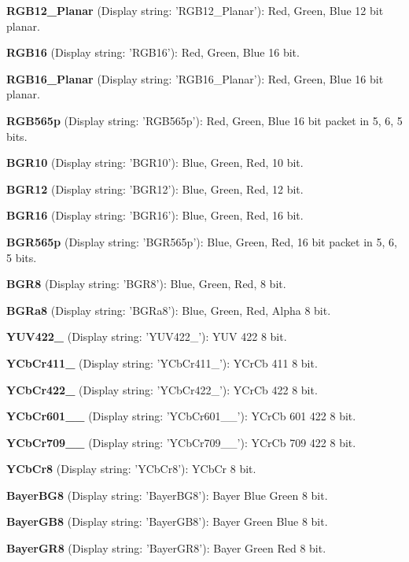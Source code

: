 \begin{DoxyItemize}
\item {\bfseries R\+G\+B12\+\_\+\+Planar} (Display string\+: 'R\+G\+B12\+\_\+\+Planar')\+: Red, Green, Blue 12 bit planar.
\item {\bfseries R\+G\+B16} (Display string\+: 'R\+G\+B16')\+: Red, Green, Blue 16 bit.
\item {\bfseries R\+G\+B16\+\_\+\+Planar} (Display string\+: 'R\+G\+B16\+\_\+\+Planar')\+: Red, Green, Blue 16 bit planar.
\item {\bfseries R\+G\+B565p} (Display string\+: 'R\+G\+B565p')\+: Red, Green, Blue 16 bit packet in 5, 6, 5 bits.
\item {\bfseries B\+G\+R10} (Display string\+: 'B\+G\+R10')\+: Blue, Green, Red, 10 bit.
\item {\bfseries B\+G\+R12} (Display string\+: 'B\+G\+R12')\+: Blue, Green, Red, 12 bit.
\item {\bfseries B\+G\+R16} (Display string\+: 'B\+G\+R16')\+: Blue, Green, Red, 16 bit.
\item {\bfseries B\+G\+R565p} (Display string\+: 'B\+G\+R565p')\+: Blue, Green, Red, 16 bit packet in 5, 6, 5 bits.
\item {\bfseries B\+G\+R8} (Display string\+: 'B\+G\+R8')\+: Blue, Green, Red, 8 bit.
\item {\bfseries B\+G\+Ra8} (Display string\+: 'B\+G\+Ra8')\+: Blue, Green, Red, Alpha 8 bit.
\item {\bfseries Y\+U\+V422\+\_} (Display string\+: 'Y\+U\+V422\+\_')\+: Y\+U\+V 422 8 bit.
\item {\bfseries Y\+Cb\+Cr411\+\_} (Display string\+: 'Y\+Cb\+Cr411\+\_')\+: Y\+Cr\+Cb 411 8 bit.
\item {\bfseries Y\+Cb\+Cr422\+\_} (Display string\+: 'Y\+Cb\+Cr422\+\_')\+: Y\+Cr\+Cb 422 8 bit.
\item {\bfseries Y\+Cb\+Cr601\+\_\+\_} (Display string\+: 'Y\+Cb\+Cr601\+\_\+\_')\+: Y\+Cr\+Cb 601 422 8 bit.
\item {\bfseries Y\+Cb\+Cr709\+\_\+\_} (Display string\+: 'Y\+Cb\+Cr709\+\_\+\_')\+: Y\+Cr\+Cb 709 422 8 bit.
\item {\bfseries Y\+Cb\+Cr8} (Display string\+: 'Y\+Cb\+Cr8')\+: Y\+Cb\+Cr 8 bit.
\item {\bfseries Bayer\+B\+G8} (Display string\+: 'Bayer\+B\+G8')\+: Bayer Blue Green 8 bit.
\item {\bfseries Bayer\+G\+B8} (Display string\+: 'Bayer\+G\+B8')\+: Bayer Green Blue 8 bit.
\item {\bfseries Bayer\+G\+R8} (Display string\+: 'Bayer\+G\+R8')\+: Bayer Green Red 8 bit.

\end{DoxyItemize}
